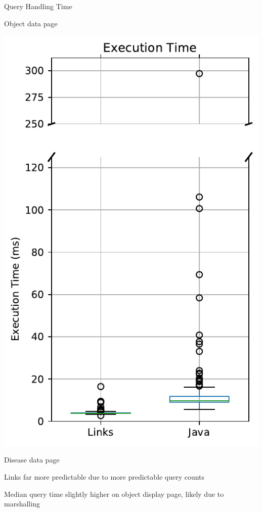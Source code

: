 \documentclass[11.5pt, aspectratio=169]{beamer}
\begin{document}
\begin{frame}{Query Handling Time}
\begin{minipage}{0.28\textwidth}
    \begin{center}
      Object data page
    \end{center}
  \end{minipage}
  \hfill
  \begin{minipage}{0.28\textwidth}
    \centering
    \includegraphics[scale=0.4]{images/diseasedisplay_querytime_box.pdf}

    \begin{center}
      Disease data page
    \end{center}
  \end{minipage}
  \hfill
  \begin{minipage}{0.375\textwidth}
    \raggedright
    \begin{fullpageitemize}
      \item Links far more predictable due to more predictable query counts
        \vspace{1em}
      \item Median query time slightly higher on object display page, likely due to marshalling
    \end{fullpageitemize}
  \end{minipage}
\end{frame}
\end{document}
